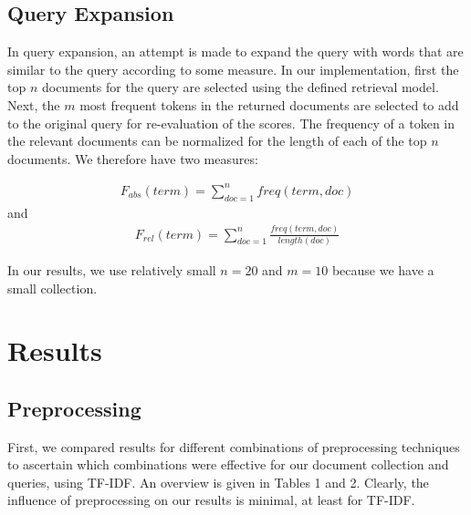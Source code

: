 \documentclass{article}
\begin{document}
\subsection*{Query Expansion}
In query expansion, an attempt is made to expand the query with words that are similar to the query according to some measure. In our implementation, first the top $n$ documents for the query are selected using the defined retrieval model. Next, the $m$ most frequent tokens in the returned documents are selected to add to the original query for re-evaluation of the scores. The frequency of a token in the relevant documents can be normalized for the length of each of the top $n$ documents. We therefore have two measures:

\begin{align*}
F_{abs}(term) = \sum_{doc=1}^{n}freq(term,doc)
\end{align*}
and
\begin{align*}
F_{rel}(term) = \sum_{doc=1}^{n}\frac{freq(term,doc)}{length(doc)}
\end{align*}

In our results, we use relatively small $n = 20$ and $m = 10$ because we have a small collection.

\section*{Results}

\subsection*{Preprocessing}

First, we compared results for different combinations of preprocessing techniques to ascertain which combinations were effective for our document collection and queries, using TF-IDF. An overview is given in Tables 1 and 2. Clearly, the influence of preprocessing on our results is minimal, at least for TF-IDF.
\end{document}
